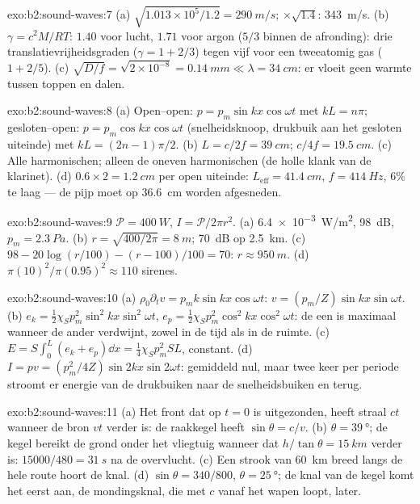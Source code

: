 \begin{solution}{exo:b2:sound-waves:7}
(a) $\sqrt{1.013 \times 10^5/1.2} = \qty{290}{m/s}$; $\times\sqrt{1.4}$:
\qty{343}{m/s}. (b) $\gamma = c^2M/RT$: $1.40$ voor lucht, $1.71$ voor argon
($5/3$ binnen de afronding): drie translatievrijheidsgraden
($\gamma = 1 + 2/3$) tegen vijf voor een tweeatomig gas ($1 + 2/5$). (c)
$\sqrt{D/f} = \sqrt{2 \times 10^{-8}} = \qty{0.14}{mm}
\ll \lambda = \qty{34}{cm}$:
er vloeit geen warmte tussen toppen en dalen.
\end{solution}

\begin{solution}{exo:b2:sound-waves:8}
(a) Open--open: $p = p_m\sin kx\cos\omega t$ met $kL = n\pi$;
gesloten--open: $p = p_m\cos kx\cos\omega t$ (snelheidsknoop, drukbuik aan
het gesloten uiteinde) met $kL = (2n - 1)\pi/2$. (b)
$L = c/2f = \qty{39}{cm}$; $c/4f = \qty{19.5}{cm}$. (c) Alle harmonischen;
alleen de oneven harmonischen (de holle klank van de klarinet). (d)
$0.6 \times 2 = \qty{1.2}{cm}$ per open uiteinde:
$L_{\text{eff}} = \qty{41.4}{cm}$, $f =
\qty{414}{Hz}$, $6\%$ te laag --- de
pijp moet op \qty{36.6}{cm} worden afgesneden.
\end{solution}

\begin{solution}{exo:b2:sound-waves:9}
$\mathcal P = \qty{400}{W}$, $I = \mathcal P/2\pi r^2$. (a)
\qty{6.4e-3}{W/m^2}, \qty{98}{dB}, $p_m = \qty{2.3}{Pa}$. (b)
$r = \sqrt{400/2\pi} = \qty{8}{m}$; \qty{70}{dB} op \qty{2.5}{km}. (c)
$98 - 20\log(r/100) - (r - 100)/100 = 70$: $r \approx \qty{950}{m}$. (d)
$\pi(10)^2/\pi(0.95)^2 \approx 110$ sirenes.
\end{solution}

\begin{solution}{exo:b2:sound-waves:10}
(a) $\rho_0\partial_tv = p_mk\sin kx\cos\omega t$:
$v = (p_m/Z)\sin kx\sin\omega t$. (b)
$e_k = \tfrac12\chi_Sp_m^2\sin^2kx\sin^2\omega t$,
$e_p = \tfrac12\chi_Sp_m^2\cos^2kx\cos^2\omega t$: de een is maximaal
wanneer de ander verdwijnt, zowel in de tijd als in de ruimte. (c)
$E =
S\int_0^L(e_k + e_p)\dd x = \tfrac14\chi_Sp_m^2SL$, constant. (d)
$I = pv =
(p_m^2/4Z)\sin2kx\sin2\omega t$: gemiddeld nul, maar twee keer per
periode stroomt er energie van de drukbuiken naar de snelheidsbuiken en
terug.
\end{solution}

\begin{solution}{exo:b2:sound-waves:11}
(a) Het front dat op $t = 0$ is uitgezonden, heeft straal $ct$ wanneer de
bron $vt$ verder is: de raakkegel heeft $\sin\theta = c/v$. (b)
$\theta = \qty{39}{\degree}$; de kegel bereikt de grond onder het vliegtuig
wanneer dat $h/\tan\theta = \qty{15}{km}$ verder is:
$15000/480 = \qty{31}{s}$ na de overvlucht. (c) Een strook van \qty{60}{km}
breed langs de hele route hoort de knal. (d) $\sin\theta
= 340/800$,
$\theta = \qty{25}{\degree}$; de knal van de kegel komt het eerst aan, de
mondingsknal, die met $c$ vanaf het wapen loopt, later.
\end{solution}

